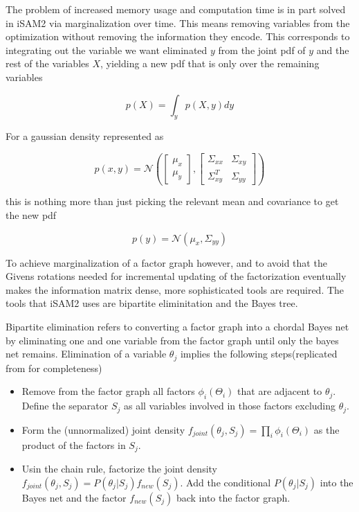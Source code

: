 The problem of increased memory usage and computation time is in part solved in iSAM2 via marginalization over time. This means removing variables from the optimization without removing the information they encode. This corresponds to integrating out the variable we want eliminated $y$ from the joint pdf of $y$ and the rest of the variables $X$, yielding a new pdf that is only over the remaining variables

\begin{equation}
    p(X) = \int_yp(X,y)dy
\end{equation}

For a gaussian density represented as 

\begin{equation}
    p(x,y) = \mathcal{N}(\begin{bmatrix}\mu_x \\ \mu_y \end{bmatrix}, \begin{bmatrix} \Sigma_{xx} & \Sigma_{xy} \\ \Sigma_{xy}^T & \Sigma_{yy} \end{bmatrix}) 
\end{equation}

this is nothing more than just picking the relevant mean and covariance to get the new pdf

\begin{equation}
    p(y) = \mathcal{N}(\mu_x,\Sigma_{yy})
\end{equation}

To achieve marginalization of a factor graph however, and to avoid that the Givens rotations needed for incremental updating of the factorization eventually makes the information matrix dense, more sophisticated tools are required. The tools that iSAM2 uses are bipartite eliminitation\cite{BipartElim} and the Bayes tree\cite{BayesTree}. 

Bipartite elimination refers to converting a factor graph into a chordal Bayes net by eliminating one and one variable from the factor graph until only the bayes net remains. Elimination of a variable $\theta_j$ implies the following steps(replicated from \cite{iSAM2} for completeness)

\begin{itemize}
    \item Remove from the factor graph all factors $\phi_i(\Theta_i)$ that are adjacent to $\theta_j$. Define the separator $S_j$ as all variables involved in those factors excluding $\theta_j$.
    \item Form the (unnormalized) joint density $f_{joint}(\theta_j,S_j) = \prod_i\phi_i(\Theta_i)$ as the product of the factors in $S_j$.
    \item Usin the chain rule, factorize the joint density $f_{joint}(\theta_j, S_j) = P(\theta_j| S_j)f_{new}(S_j)$. Add the conditional $P(\theta_j|S_j)$ into the Bayes net and the factor $f_{new}(S_j)$ back into the factor graph.
\end{itemize}

